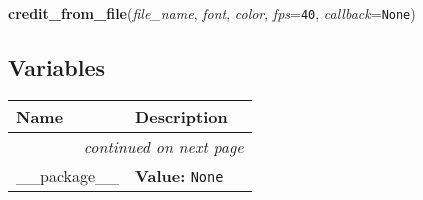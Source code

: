     \label{credit:credit_from_file}

    \vspace{0.5ex}

\hspace{.8\funcindent}\begin{boxedminipage}{\funcwidth}

    \raggedright \textbf{credit\_from\_file}(\textit{file\_name}, \textit{font}, \textit{color}, \textit{fps}={\tt 40}, \textit{callback}={\tt None})

\setlength{\parskip}{2ex}
\setlength{\parskip}{1ex}
    \end{boxedminipage}



  \subsection{Variables}

    \vspace{-1cm}
\hspace{\varindent}\begin{longtable}{|p{\varnamewidth}|p{\vardescrwidth}|l}
\cline{1-2}
\cline{1-2} \centering \textbf{Name} & \centering \textbf{Description}& \\
\cline{1-2}
\endhead\cline{1-2}\multicolumn{3}{r}{\small\textit{continued on next page}}\\\endfoot\cline{1-2}
\endlastfoot\raggedright \_\-\_\-p\-a\-c\-k\-a\-g\-e\-\_\-\_\- & \raggedright \textbf{Value:} 
{\tt None}&\\
\cline{1-2}
\end{longtable}

